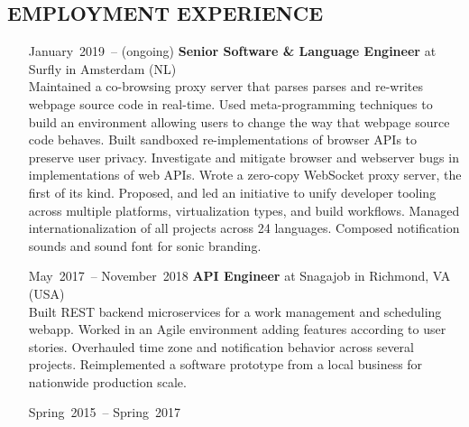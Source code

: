 \documentclass{res}     %
\begin{document}

\begin{resume}

\section{EMPLOYMENT EXPERIENCE}
\vspace{5mm}
\begin{itemize}[font=\itshape,align=parleft,labelwidth=3cm,leftmargin=2cm]
    \item[January~2019~-- (ongoing)]
        \textbf{Senior Software \& Language Engineer}
        at Surfly
        in Amsterdam (NL)
        \vspace{1mm} \\
        Maintained a co-browsing proxy server that parses parses and re-writes webpage source code in real-time.
        Used meta-programming techniques to build an environment allowing users to change the way that webpage source code behaves.
        Built sandboxed re-implementations of browser APIs to preserve user privacy.
        Investigate and mitigate browser and webserver bugs in implementations of web APIs.
        Wrote a zero-copy WebSocket proxy server, the first of its kind.
        Proposed, and led an initiative to unify developer tooling across multiple platforms, virtualization types, and build workflows.
        Managed \mbox{internationalization} of all projects across 24 languages.
        Composed notification sounds and sound font for sonic branding.
    \item[May~2017~-- November~2018]
        \textbf{API Engineer}
        at Snagajob
        in Richmond, VA (USA)
        \vspace{1mm} \\
        Built REST backend microservices for a work management and scheduling webapp.
        Worked in an Agile environment adding features according to user stories.
        Overhauled time zone and notification behavior across several projects.
        Reimplemented a software prototype from a local business for nationwide production scale.
    \item[Spring~2015~-- Spring~2017]

\end{itemize}
\end{resume}
\end{document}
